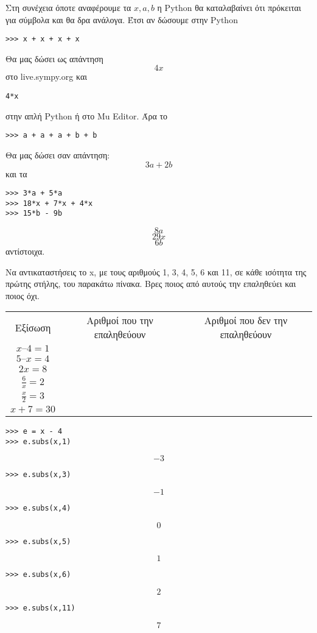 Στη συνέχεια όποτε αναφέρουμε τα $x, a, b$ η Python θα καταλαβαίνει ότι πρόκειται για σύμβολα και θα δρα ανάλογα.
Έτσι αν δώσουμε στην Python
\begin{lstlisting}
>>> x + x + x + x
\end{lstlisting}
Θα μας δώσει ως απάντηση
$$4x$$
στο live.sympy.org
και
\begin{lstlisting}
4*x
\end{lstlisting}
στην απλή Python ή στο Mu Editor.
Άρα το 
\begin{lstlisting}
>>> a + a + a + b + b
\end{lstlisting}
Θα μας δώσει σαν απάντηση:
$$3a+2b$$
και τα 
\begin{lstlisting}
>>> 3*a + 5*a 
>>> 18*x + 7*x + 4*x
>>> 15*b - 9b
\end{lstlisting}
$$8a$$
$$29x$$
$$6b$$
αντίστοιχα.
\begin{exercise}
Να αντικαταστήσεις το x, με τους αριθμούς 1, 3, 4, 5, 6 και 11, σε κάθε ισότητα της πρώτης στήλης, του παρακάτω πίνακα. Βρες ποιος από αυτούς την επαληθεύει και ποιος όχι.

\begin{tabular}{|c|c|c|}
Εξίσωση            &Αριθμοί που την επαληθεύουν     &Αριθμοί που δεν την επαληθεύουν\\
$x – 4 = 1$        &                             &                                \\
$5 – x = 4$        &                             &                                \\
$2x = 8$           &                             &                                \\
$\frac{6}{x} = 2$  &                             &                                \\
$\frac{x}{2} = 3$  &                             &                                \\
$x + 7 = 30$       &                             &                                \\
\end{tabular}
\end{exercise}

\begin{lstlisting}
>>> e = x - 4
>>> e.subs(x,1)
\end{lstlisting}
$$−3$$
\begin{lstlisting}
>>> e.subs(x,3)
\end{lstlisting}
$$−1$$
\begin{lstlisting}
>>> e.subs(x,4)
\end{lstlisting}
$$0$$
\begin{lstlisting}
>>> e.subs(x,5)
\end{lstlisting}
$$1$$
\begin{lstlisting}
>>> e.subs(x,6)
\end{lstlisting}
$$2$$
\begin{lstlisting}
>>> e.subs(x,11)
\end{lstlisting}
$$7$$

